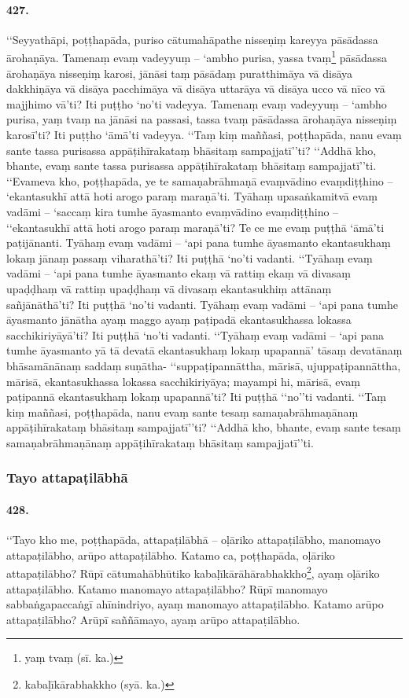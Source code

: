 \paragraph{427.} ‘‘Seyyathāpi, poṭṭhapāda, puriso cātumahāpathe nisseṇiṃ kareyya pāsādassa ārohaṇāya. Tamenaṃ evaṃ vadeyyuṃ – ‘ambho purisa, yassa tvaṃ\footnote{yaṃ tvaṃ (sī. ka.)} pāsādassa ārohaṇāya nisseṇiṃ karosi, jānāsi taṃ pāsādaṃ puratthimāya vā disāya dakkhiṇāya vā disāya pacchimāya vā disāya uttarāya vā disāya ucco vā nīco vā majjhimo vā’ti? Iti puṭṭho ‘no’ti vadeyya. Tamenaṃ evaṃ vadeyyuṃ – ‘ambho purisa, yaṃ tvaṃ na jānāsi na passasi, tassa tvaṃ pāsādassa ārohaṇāya nisseṇiṃ karosī’ti? Iti puṭṭho ‘āmā’ti vadeyya. ‘‘Taṃ kiṃ maññasi, poṭṭhapāda, nanu evaṃ sante tassa purisassa appāṭihīrakataṃ bhāsitaṃ sampajjatī’’ti? ‘‘Addhā kho, bhante, evaṃ sante tassa purisassa appāṭihīrakataṃ bhāsitaṃ sampajjatī’’ti. ‘‘Evameva kho, poṭṭhapāda, ye te samaṇabrāhmaṇā evaṃvādino evaṃdiṭṭhino – ‘ekantasukhī attā hoti arogo paraṃ maraṇā’ti. Tyāhaṃ upasaṅkamitvā evaṃ vadāmi – ‘saccaṃ kira tumhe āyasmanto evaṃvādino evaṃdiṭṭhino – ‘‘ekantasukhī attā hoti arogo paraṃ maraṇā’ti? Te ce me evaṃ puṭṭhā ‘āmā’ti paṭijānanti. Tyāhaṃ evaṃ vadāmi – ‘api pana tumhe āyasmanto ekantasukhaṃ lokaṃ jānaṃ passaṃ viharathā’ti? Iti puṭṭhā ‘no’ti vadanti. ‘‘Tyāhaṃ evaṃ vadāmi – ‘api pana tumhe āyasmanto ekaṃ vā rattiṃ ekaṃ vā divasaṃ upaḍḍhaṃ vā rattiṃ upaḍḍhaṃ vā divasaṃ ekantasukhiṃ attānaṃ sañjānāthā’ti? Iti puṭṭhā ‘no’ti vadanti. Tyāhaṃ evaṃ vadāmi – ‘api pana tumhe āyasmanto jānātha ayaṃ maggo ayaṃ paṭipadā ekantasukhassa lokassa sacchikiriyāyā’ti? Iti puṭṭhā ‘no’ti vadanti. ‘‘Tyāhaṃ evaṃ vadāmi – ‘api pana tumhe āyasmanto yā tā devatā ekantasukhaṃ lokaṃ upapannā’ tāsaṃ devatānaṃ bhāsamānānaṃ saddaṃ suṇātha- ‘‘suppaṭipannāttha, mārisā, ujuppaṭipannāttha, mārisā, ekantasukhassa lokassa sacchikiriyāya; mayampi hi, mārisā, evaṃ paṭipannā ekantasukhaṃ lokaṃ upapannā’ti? Iti puṭṭhā ‘‘no’’ti vadanti. ‘‘Taṃ kiṃ maññasi, poṭṭhapāda, nanu evaṃ sante tesaṃ samaṇabrāhmaṇānaṃ appāṭihīrakataṃ bhāsitaṃ sampajjatī’’ti? ‘‘Addhā kho, bhante, evaṃ sante tesaṃ samaṇabrāhmaṇānaṃ appāṭihīrakataṃ bhāsitaṃ sampajjatī’’ti.

\subsubsection{Tayo attapaṭilābhā}

\paragraph{428.} ‘‘Tayo kho me, poṭṭhapāda, attapaṭilābhā – oḷāriko attapaṭilābho, manomayo attapaṭilābho, arūpo attapaṭilābho. Katamo ca, poṭṭhapāda, oḷāriko attapaṭilābho? Rūpī cātumahābhūtiko kabaḷīkārāhārabhakkho\footnote{kabaḷīkārabhakkho (syā. ka.)}, ayaṃ oḷāriko attapaṭilābho. Katamo manomayo attapaṭilābho? Rūpī manomayo sabbaṅgapaccaṅgī ahīnindriyo, ayaṃ manomayo attapaṭilābho. Katamo arūpo attapaṭilābho? Arūpī saññāmayo, ayaṃ arūpo attapaṭilābho.

